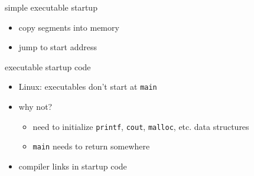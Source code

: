 
\begin{frame}{simple executable startup}
    \begin{itemize}
    \item copy segments into memory
    \item jump to start address
    \end{itemize}
\end{frame}

\begin{frame}{executable startup code}
    \begin{itemize}
    \item Linux: executables don't start at {\tt main}
    \item why not?
        \begin{itemize}
        \item need to initialize {\tt printf}, {\tt cout}, {\tt malloc}, etc. data structures
        \item {\tt main} needs to return somewhere
        \end{itemize}
    \item compiler links in startup code
    \end{itemize}
\end{frame}


